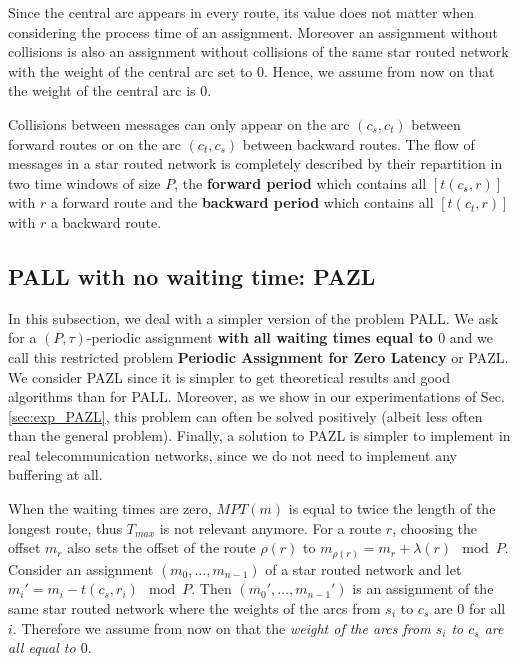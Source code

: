 \documentclass[10pt, conference, letterpaper]{IEEEtran}
\begin{document}
  Since the central arc appears in every route, its value does not matter when considering the process time of an assignment.
  Moreover an assignment without collisions is also an assignment without collisions of the same star routed network with the weight of the central arc set to $0$. Hence, we assume from now on that the weight of the central arc is $0$.
      
      
  Collisions between messages can only appear on the arc $(c_s,c_t)$ between forward routes or on the arc $(c_t,c_s)$
  between backward routes. The flow of messages in a star routed network is completely described by their repartition in two time windows of size $P$, the {\bf forward period} which contains all $[t(c_s,r)]$ with $r$ a forward route and the {\bf backward period} which contains all $[t(c_t,r)]$ with $r$ a backward route.


  \subsection{PALL with no waiting time: PAZL}
  
  In this subsection, we deal with a simpler version of the problem PALL.
  We ask for a $(P,\tau)$-periodic assignment {\bf with all waiting times equal to $0$} and we call this restricted problem {\bf Periodic Assignment for Zero Latency} or PAZL. We consider PAZL since it is simpler to get theoretical results and good algorithms 
  than for PALL. Moreover, as we show in our experimentations of Sec.\ref{sec:exp_PAZL}, this problem can often be solved positively (albeit less often than the general problem). Finally, a solution to PAZL is simpler to implement in real telecommunication networks, since we do not need to implement any buffering at all.    
  
  When the waiting times are zero, $MPT(m)$ is equal to twice the length of the longest route, thus $T_{max}$ is not relevant anymore. For a route $r$, choosing the offset $m_r$ also sets the offset of the route $\rho(r)$ to $m_{\rho(r)} = m_{r} + \lambda(r) \mod P$.
  Consider an assignment $(m_0,\dots,m_{n-1})$ of a star routed network and let $m_i'= m_{i} - t(c_s,r_i) \mod P$.
  Then $(m_0',\dots,m_{n-1}')$ is an assignment of the same star routed network where the weights of the arcs from $s_i$ to $c_s$ are $0$ for all $i$. Therefore we assume from now on that the \emph{weight of the arcs from $s_i$ to $c_s$ are all equal to $0$}.
  
\end{document}
